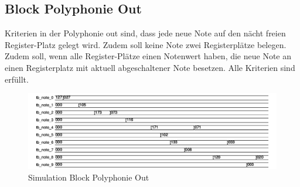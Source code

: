 \subsection{Block Polyphonie Out}
Kriterien in der Polyphonie out sind, dass jede neue Note auf den nächt freien Register-Platz gelegt wird. Zudem soll keine Note zwei Registerplätze belegen. Zudem soll, wenn alle Register-Plätze einen Notenwert haben, die neue Note an einen Registerplatz mit aktuell abgeschaltener Note besetzen.
Alle Kriterien sind erfüllt.\\

\begin{figure}[H]
	\centering
	\includegraphics[width=1\textwidth]{images/midi_interface/tb_polyphonie.png}
	\caption{Simulation Block Polyphonie Out}
	\label{fig.test_polyphonie}
\end{figure} 

